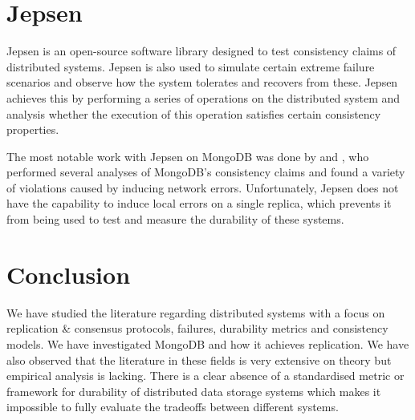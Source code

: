 \section{Jepsen}
Jepsen is an open-source software library designed to test consistency claims of distributed systems. Jepsen is also used to simulate certain extreme failure scenarios and observe how the system tolerates and recovers from these. Jepsen achieves this by performing a series of operations on the distributed system and analysis whether the execution of this operation satisfies certain consistency properties.

The most notable work with Jepsen on MongoDB was done by \citeauthor{jepsen-2017} and \citeauthor{jepsen-2018} \citep{jepsen-2017, jepsen-2018}, who performed several analyses of MongoDB's consistency claims and found a variety of violations caused by inducing network errors. Unfortunately, Jepsen does not have the capability to induce local errors on a single replica, which prevents it from being used to test and measure the durability of these systems.

\section{Conclusion}
We have studied the literature regarding distributed systems with a focus on replication \& consensus protocols, failures, durability metrics and consistency models. We have investigated MongoDB and how it achieves replication. We have also observed that the literature in these fields is very extensive on theory but empirical analysis is lacking. There is a clear absence of a standardised metric or framework for durability of distributed data storage systems which makes it impossible to fully evaluate the tradeoffs between different systems.




